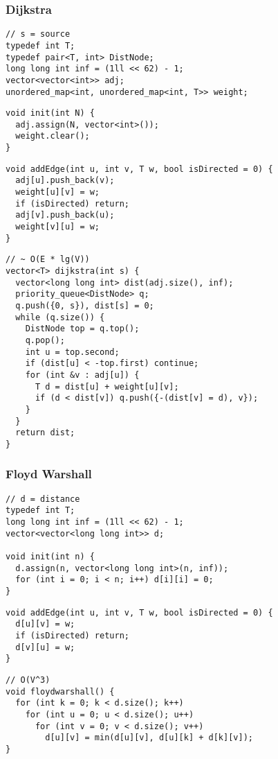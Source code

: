 \documentclass[twoside]{article}
\begin{document}
\begin{multicols*}{2}
\subsubsection*{Dijkstra}
\begin{verbatim}
// s = source
typedef int T;
typedef pair<T, int> DistNode;
long long int inf = (1ll << 62) - 1;
vector<vector<int>> adj;
unordered_map<int, unordered_map<int, T>> weight;
\end{verbatim}
\vspace{-12pt}
\begin{verbatim}
void init(int N) {
  adj.assign(N, vector<int>());
  weight.clear();
}
\end{verbatim}
\vspace{-12pt}
\begin{verbatim}
void addEdge(int u, int v, T w, bool isDirected = 0) {
  adj[u].push_back(v);
  weight[u][v] = w;
  if (isDirected) return;
  adj[v].push_back(u);
  weight[v][u] = w;
}
\end{verbatim}
\vspace{-12pt}
\begin{verbatim}
// ~ O(E * lg(V))
vector<T> dijkstra(int s) {
  vector<long long int> dist(adj.size(), inf);
  priority_queue<DistNode> q;
  q.push({0, s}), dist[s] = 0;
  while (q.size()) {
    DistNode top = q.top();
    q.pop();
    int u = top.second;
    if (dist[u] < -top.first) continue;
    for (int &v : adj[u]) {
      T d = dist[u] + weight[u][v];
      if (d < dist[v]) q.push({-(dist[v] = d), v});
    }
  }
  return dist;
}
\end{verbatim}

\subsubsectionfont{\large\bfseries\sffamily\underline}
\subsubsection*{Floyd Warshall}
\begin{verbatim}
// d = distance
typedef int T;
long long int inf = (1ll << 62) - 1;
vector<vector<long long int>> d;

void init(int n) {
  d.assign(n, vector<long long int>(n, inf));
  for (int i = 0; i < n; i++) d[i][i] = 0;
}
\end{verbatim}
\vspace{-12pt}
\begin{verbatim}
void addEdge(int u, int v, T w, bool isDirected = 0) {
  d[u][v] = w;
  if (isDirected) return;
  d[v][u] = w;
}
\end{verbatim}
\vspace{-12pt}
\begin{verbatim}
// O(V^3)
void floydwarshall() {
  for (int k = 0; k < d.size(); k++)
    for (int u = 0; u < d.size(); u++)
      for (int v = 0; v < d.size(); v++)
        d[u][v] = min(d[u][v], d[u][k] + d[k][v]);
}
\end{verbatim}


\end{multicols*}
\end{document}

